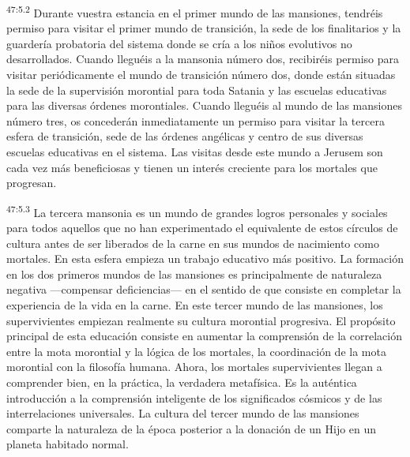 \par
\textsuperscript{47:5.2} Durante vuestra estancia en el primer mundo de las mansiones, tendréis permiso para visitar el primer mundo de transición, la sede de los finalitarios y la guardería probatoria del sistema donde se cría a los niños evolutivos no desarrollados. Cuando lleguéis a la mansonia número dos, recibiréis permiso para visitar periódicamente el mundo de transición número dos, donde están situadas la sede de la supervisión morontial para toda Satania y las escuelas educativas para las diversas órdenes morontiales. Cuando lleguéis al mundo de las mansiones número tres, os concederán inmediatamente un permiso para visitar la tercera esfera de transición, sede de las órdenes angélicas y centro de sus diversas escuelas educativas en el sistema. Las visitas desde este mundo a Jerusem son cada vez más beneficiosas y tienen un interés creciente para los mortales que progresan.

\par
\textsuperscript{47:5.3} La tercera mansonia es un mundo de grandes logros personales y sociales para todos aquellos que no han experimentado el equivalente de estos círculos de cultura antes de ser liberados de la carne en sus mundos de nacimiento como mortales. En esta esfera empieza un trabajo educativo más positivo. La formación en los dos primeros mundos de las mansiones es principalmente de naturaleza negativa ---compensar deficiencias--- en el sentido de que consiste en completar la experiencia de la vida en la carne. En este tercer mundo de las mansiones, los supervivientes empiezan realmente su cultura morontial progresiva. El propósito principal de esta educación consiste en aumentar la comprensión de la correlación entre la mota morontial y la lógica de los mortales, la coordinación de la mota morontial con la filosofía humana. Ahora, los mortales supervivientes llegan a comprender bien, en la práctica, la verdadera metafísica. Es la auténtica introducción a la comprensión inteligente de los significados cósmicos y de las interrelaciones universales. La cultura del tercer mundo de las mansiones comparte la naturaleza de la época posterior a la donación de un Hijo en un planeta habitado normal.

